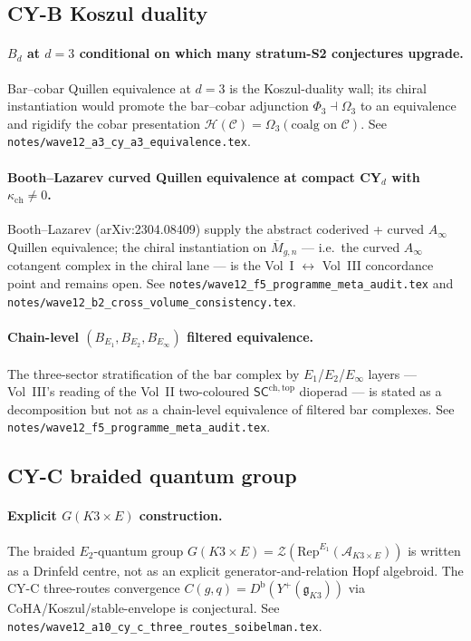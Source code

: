 \documentclass[11pt]{article}
\providecommand{\kch}{\kappa_{\mathrm{ch}}}
\providecommand{\Eone}{E_1}
\providecommand{\Etwo}{E_2}
\providecommand{\Einf}{E_\infty}
\providecommand{\fg}{\mathfrak{g}}
\providecommand{\Db}{D^{\mathrm{b}}}
\begin{document}
\subsection{CY-B Koszul duality}

\paragraph{$B_d$ at $d = 3$ conditional on which many stratum-S2
conjectures upgrade.} Bar--cobar Quillen equivalence at $d = 3$ is
the Koszul-duality wall; its chiral instantiation would promote the
bar--cobar adjunction $\Phi_3 \dashv \Omega_3$ to an equivalence and
rigidify the cobar presentation
$\mathcal{H}(\mathcal{C}) = \Omega_3(\text{coalg on }\mathcal{C})$.
See \texttt{notes/wave12\_a3\_cy\_a3\_equivalence.tex}.

\paragraph{Booth--Lazarev curved Quillen equivalence at compact CY$_d$
with $\kch \neq 0$.} Booth--Lazarev (arXiv:2304.08409) supply the
abstract coderived + curved $A_\infty$ Quillen equivalence; the
chiral instantiation on $\overline{M}_{g, n}$ --- i.e.~the
curved $A_\infty$ cotangent complex in the chiral lane --- is the
Vol~I $\leftrightarrow$ Vol~III concordance point and remains open. See
\texttt{notes/wave12\_f5\_programme\_meta\_audit.tex} and
\texttt{notes/wave12\_b2\_cross\_volume\_consistency.tex}.

\paragraph{Chain-level $(B_{\Eone}, B_{\Etwo}, B_{\Einf})$ filtered
equivalence.} The three-sector stratification of the bar complex by
$\Eone$/$\Etwo$/$\Einf$ layers --- Vol~III's reading of the Vol~II
two-coloured $\mathsf{SC}^{\mathrm{ch, top}}$ dioperad --- is stated
as a decomposition but not as a chain-level equivalence of filtered
bar complexes. See
\texttt{notes/wave12\_f5\_programme\_meta\_audit.tex}.

\subsection{CY-C braided quantum group}

\paragraph{Explicit $G(K3 \times E)$ construction.} The braided
$\Etwo$-quantum group $G(K3 \times E) = \mathcal{Z}(\mathrm{Rep}^{\Eone}(\mathcal{A}_{K3 \times E}))$
is written as a Drinfeld centre, not as an explicit
generator-and-relation Hopf algebroid. The CY-C three-routes
convergence $C(g, q) = \Db(Y^+(\fg_{K3}))$ via
CoHA/Koszul/stable-envelope is conjectural. See
\texttt{notes/wave12\_a10\_cy\_c\_three\_routes\_soibelman.tex}.
\end{document}
